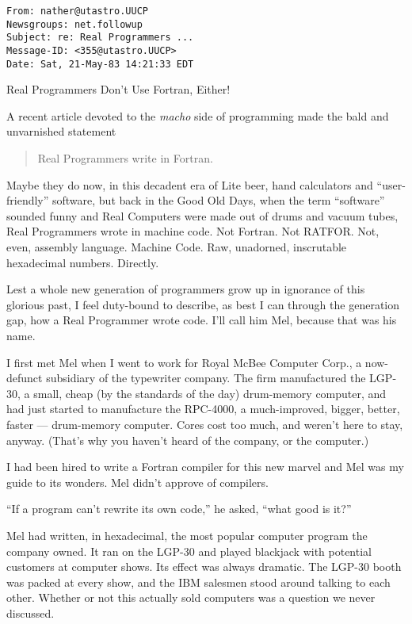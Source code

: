 \documentclass[12pt]{article}
\begin{document}
\begin{verbatim}
From: nather@utastro.UUCP
Newsgroups: net.followup
Subject: re: Real Programmers ...
Message-ID: <355@utastro.UUCP>
Date: Sat, 21-May-83 14:21:33 EDT
\end{verbatim}

\begin{center}
Real Programmers Don't Use Fortran, Either!
\end{center}

\noindent
A recent article devoted to the {\it macho} side of programming
made the bald and unvarnished statement

\begin{quote}
Real Programmers write in Fortran.
\end{quote}

\noindent
Maybe they do now, in this decadent era of Lite beer, hand
calculators and ``user-friendly'' software, but back in the
Good Old Days, when the term ``software'' sounded funny and
Real Computers were made out of drums and vacuum tubes, Real
Programmers wrote in machine code. Not Fortran. Not RATFOR.
Not, even, assembly language. Machine Code. Raw,
unadorned, inscrutable hexadecimal numbers. Directly.

\bigskip
\noindent
Lest a whole new generation of programmers grow up in
ignorance of this glorious past, I feel duty-bound to
describe, as best I can through the generation gap, how a
Real Programmer wrote code. I'll call him Mel, because that
was his name.

\bigskip
\noindent
I first met Mel when I went to work for Royal McBee Computer
Corp., a now-defunct subsidiary of the typewriter company.
The firm manufactured the LGP-30, a small, cheap (by the
standards of the day) drum-memory computer, and had just
started to manufacture the RPC-4000, a much-improved,
bigger, better, faster --- drum-memory computer. Cores cost
too much, and weren't here to stay, anyway. (That's why you
haven't heard of the company, or the computer.)

\bigskip
\noindent
I had been hired to write a Fortran compiler for this new
marvel and Mel was my guide to its wonders. Mel didn't
approve of compilers.

\bigskip
\noindent
``If a program can't rewrite its own code,'' he asked, ``what
good is it?''

\bigskip
\noindent
Mel had written, in hexadecimal, the most popular computer
program the company owned. It ran on the LGP-30 and played
blackjack with potential customers at computer shows. Its
effect was always dramatic. The LGP-30 booth was packed at
every show, and the IBM salesmen stood around talking to
each other. Whether or not this actually sold computers was
a question we never discussed.
\end{document}
